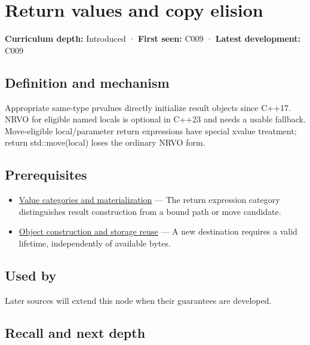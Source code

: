 \hypertarget{appendix-b08d3788c5c6}{}\label{referencestart:appendix-b08d3788c5c6}
\section{Return values and copy elision}\label{appendix-b08d3788c5c6-return-values-and-copy-elision}

\textbf{Curriculum depth:} Introduced · \textbf{First seen:} C009 · \textbf{Latest development:} C009

\subsection{Definition and mechanism}\label{appendix-b08d3788c5c6-definition-and-mechanism}

Appropriate same-type prvalues directly initialize result objects since C++17. NRVO for eligible named locals is optional in C++23 and needs a usable fallback. Move-eligible local/parameter return expressions have special xvalue treatment; return std::move(local) loses the ordinary NRVO form.

\subsection{Prerequisites}\label{appendix-b08d3788c5c6-prerequisites}

\begin{itemize}
\tightlist
\item
  \hyperref[appendix-1121b30eaeb0]{Value categories and materialization} --- The return expression category distinguishes result construction from a bound path or move candidate.
\item
  \hyperref[appendix-a82f9c438857]{Object construction and storage reuse} --- A new destination requires a valid lifetime, independently of available bytes.
\end{itemize}

\subsection{Used by}\label{appendix-b08d3788c5c6-used-by}

Later sources will extend this node when their guarantees are developed.

\subsection{Recall and next depth}\label{appendix-b08d3788c5c6-recall-and-next-depth}

